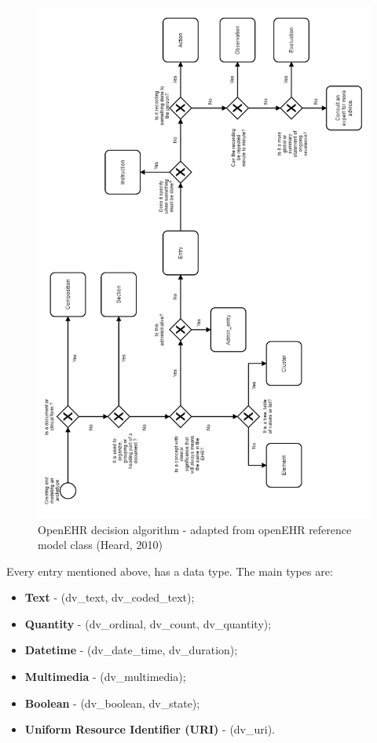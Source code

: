 \documentclass[mim_thesis.tex]{subfiles}
\begin{document}
\begin{figure}[H]
	\centering
    \includegraphics[width=1.05\textwidth]{img/decision_alg_arch.PNG}
	\caption{OpenEHR decision algorithm - adapted from openEHR reference model class (Heard, 2010) }
	\label{fig:decision_alg_arch}
\end{figure}

Every entry mentioned above, has a data type. The main types are:
\begin{itemize}[noitemsep]
\item \textbf{Text} - (dv\_text, dv\_coded\_text);
\item \textbf{Quantity} - (dv\_ordinal, dv\_count, dv\_quantity); 
\item \textbf{Date\/time} - (dv\_date\_time, dv\_duration); 
\item \textbf{Multimedia} - (dv\_multimedia); 
\item \textbf{Boolean} - (dv\_boolean, dv\_state); 
\item \textbf{Uniform Resource Identifier (URI)} - (dv\_uri).
\end{itemize}
\end{document}
